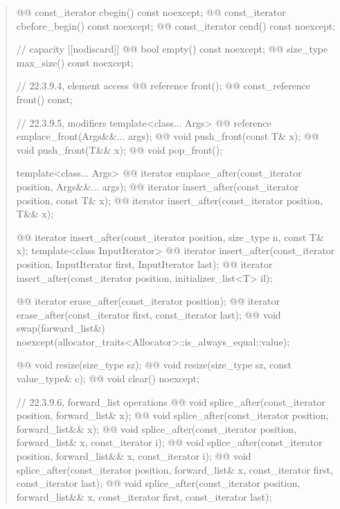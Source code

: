\documentclass{wg21}
\begin{document}
\begin{quote}
\begin{codeblock}
{{    @@ const_iterator         cbegin() const noexcept;
    @@ const_iterator         cbefore_begin() const noexcept;
    @@ const_iterator         cend() const noexcept;

    // capacity
    [[nodiscard]] @@ bool empty() const noexcept;
    @@ size_type max_size() const noexcept;

    // 22.3.9.4, element access
    @@ reference       front();
    @@ const_reference front() const;

    // 22.3.9.5, modifiers
    template<class... Args> @@ reference emplace_front(Args&&... args);
    @@ void push_front(const T& x);
    @@ void push_front(T&& x);
    @@ void pop_front();

    template<class... Args> @@ iterator emplace_after(const_iterator position, Args&&... args);
    @@ iterator insert_after(const_iterator position, const T& x);
    @@ iterator insert_after(const_iterator position, T&& x);
    
    @@ iterator insert_after(const_iterator position, size_type n, const T& x);
    template<class InputIterator>
    @@ iterator insert_after(const_iterator position, InputIterator first, InputIterator last);
    @@ iterator insert_after(const_iterator position, initializer_list<T> il);
    
    @@ iterator erase_after(const_iterator position);
    @@ iterator erase_after(const_iterator first, const_iterator last);
    @@ void     swap(forward_list&)
      noexcept(allocator_traits<Allocator>::is_always_equal::value);
    
    @@ void resize(size_type sz);
    @@ void resize(size_type sz, const value_type& c);  
    @@ void     clear() noexcept;
    
    // 22.3.9.6, forward_list operations
    @@ void splice_after(const_iterator position, forward_list& x);
    @@ void splice_after(const_iterator position, forward_list&& x);
    @@ void splice_after(const_iterator position, forward_list& x, const_iterator i);
    @@ void splice_after(const_iterator position, forward_list&& x, const_iterator i);
    @@ void splice_after(const_iterator position, forward_list& x, const_iterator first, const_iterator last);
    @@ void splice_after(const_iterator position, forward_list&& x, const_iterator first, const_iterator last);
    
}}
\end{codeblock}
\end{quote}
\end{document}
